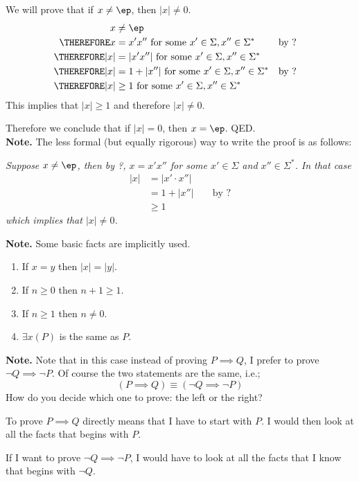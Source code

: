 We will prove that if $x \neq \ep$, then $|x| \neq 0$.
\begin{align*}
x &\neq \ep \\
\THEREFORE x &= x'x'' \text{ for some } x' \in \Sigma, x'' \in \Sigma^*
           & & \text{by ?} \\
\THEREFORE |x| &= |x' x''| \text{ for some } x' \in \Sigma, x'' \in \Sigma^* 
           \\ 
\THEREFORE |x| &= 1 + |x''| \text{ for some } x' \in \Sigma, x'' \in \Sigma^*
           & & \text{by ?} \\
\THEREFORE |x| &\geq 1 \text{ for some } x' \in \Sigma, x'' \in \Sigma^* 
\end{align*}
This implies that $|x| \geq 1$ and therefore $|x| \neq 0$.

Therefore we conclude that if $|x| = 0$, then $x = \ep$. QED.
\\

{\bf Note.}
The less formal (but equally rigorous) way to write the proof is as follows:

{\it 
Suppose $x \neq \ep$, then by ?, $x = x'x''$ 
for some $x' \in \Sigma$ and $x'' \in \Sigma^*$.
In that case
\begin{align*}
|x| 
&= |x' \cdot x''| \\ 
&= 1 + |x''| & & \text{ by ?}    \\
&\geq 1
\end{align*}
which implies that $|x| \neq 0$.
}

{\bf Note.}
Some basic facts are implicitly used.
\begin{enumerate}
\item If $x = y$ then $|x|= |y|$. 
\item If $n \geq 0$ then $n + 1 \geq 1$.
\item If $n \geq 1$ then $ n \neq 0$.
\item $\exists x(P)$ is the same as $P$.
\end{enumerate}

{\bf Note.}
Note that in this case instead of proving $P \implies Q$,
I prefer to prove $\lnot Q \implies \lnot P$.
Of course the two statements are the same, i.e.;
\[
(P \implies Q) \equiv (\lnot Q \implies \lnot P)
\]
How do you decide which one to prove: the left or the right?

To prove $P \implies Q$ directly means that I have to start with $P$.
I would then look at all the facts that begins with $P$.

If I want to prove $\lnot Q \implies \lnot P$, I would have to 
look at all the facts that I know that begins with $\lnot Q$.

